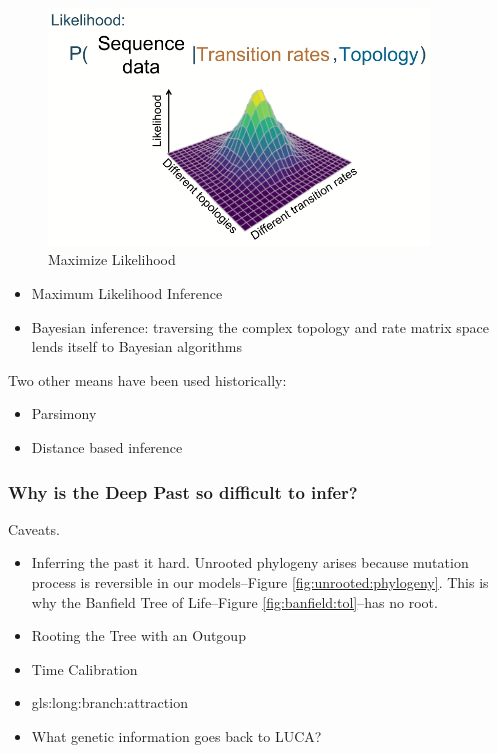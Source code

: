 \documentclass[]{article}
\begin{document}
\begin{figure}[H]
	\caption{Maximize Likelihood}\label{fig:InferringPhylogeny2}
	\includegraphics[width=0.9\textwidth]{InferringPhylogeny2}
\end{figure}

\begin{itemize}
	\item Maximum Likelihood Inference\cite{huelsenbeck1997phylogeny}
	\item Bayesian inference: traversing the complex topology and
	rate matrix space lends itself to Bayesian algorithms\cite{huelsenbeck2001mrbayes,huelsenbeck2001introduction}
\end{itemize}


Two other means have been used historically:
\begin{itemize}
	\item Parsimony
	\item Distance based inference
\end{itemize}

\subsubsection{Why is the Deep Past so difficult to infer?}
Caveats.
\begin{itemize}
	\item Inferring the past it hard. Unrooted phylogeny arises because mutation process is reversible in our models--Figure \ref{fig:unrooted:phylogeny}. This is why the Banfield Tree of Life\cite{hug2016new}--Figure \ref{fig:banfield:tol}--has no root.
	\item Rooting the Tree with an Outgoup
	\item Time Calibration
	\item \Gls{gls:long:branch:attraction}
	\item What genetic information goes back to LUCA?
\end{itemize}
\end{document}
